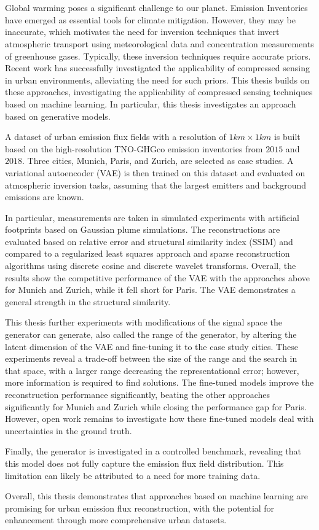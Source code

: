\chapter{\abstractname}

Global warming poses a significant challenge to our planet.
Emission Inventories have emerged as essential tools for climate mitigation.
However, they may be inaccurate, which motivates the need for inversion techniques that invert atmospheric transport using meteorological data and concentration measurements of greenhouse gases.
Typically, these inversion techniques require accurate priors.
Recent work has successfully investigated the applicability of compressed sensing in urban environments, alleviating the need for such priors.
This thesis builds on these approaches, investigating the applicability of compressed sensing techniques based on machine learning.
In particular, this thesis investigates an approach based on generative models.

A dataset of urban emission flux fields with a resolution of $1 \unit{km} \times 1 \unit{km}$ is built based on the high-resolution TNO-GHGco emission inventories from $2015$ and $2018$.
Three cities, Munich, Paris, and Zurich, are selected as case studies.
A variational autoencoder (VAE) is then trained on this dataset and evaluated on atmospheric inversion tasks, assuming that the largest emitters and background emissions are known. 

In particular, measurements are taken in simulated experiments with artificial footprints based on Gaussian plume simulations.
The reconstructions are evaluated based on relative error and structural similarity index (SSIM) and compared to a regularized least squares approach and sparse reconstruction algorithms using discrete cosine and discrete wavelet transforms.
Overall, the results show the competitive performance of the VAE with the approaches above for Munich and Zurich, while it fell short for Paris.
The VAE demonstrates a general strength in the structural similarity.

This thesis further experiments with modifications of the signal space the generator can generate, also called the range of the generator, by altering the latent dimension of the VAE and fine-tuning it to the case study cities.
These experiments reveal a trade-off between the size of the range and the search in that space, with a larger range decreasing the representational error; however, more information is required to find solutions.
The fine-tuned models improve the reconstruction performance significantly, beating the other approaches significantly for Munich and Zurich while closing the performance gap for Paris.
However, open work remains to investigate how these fine-tuned models deal with uncertainties in the ground truth.

Finally, the generator is investigated in a controlled benchmark, revealing that this model does not fully capture the emission flux field distribution.
This limitation can likely be attributed to a need for more training data.

Overall, this thesis demonstrates that approaches based on machine learning are promising for urban emission flux reconstruction, with the potential for enhancement through more comprehensive urban datasets.
